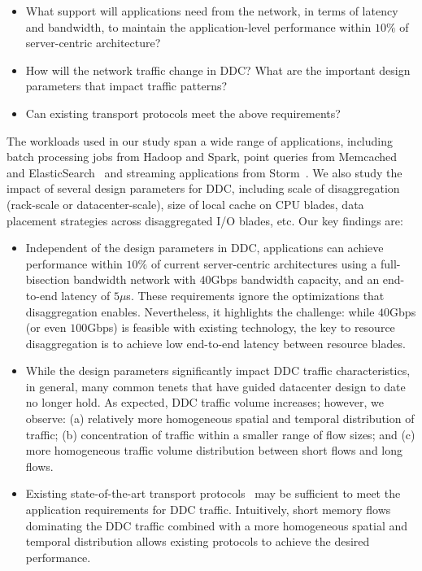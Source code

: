 \begin{itemize}[leftmargin=*]
	\itemsep0em
		\item What support will applications need from the network, in terms of latency and bandwidth, to maintain the application-level performance within $10\%$ of server-centric architecture?
	\item How will the network traffic change in DDC? What are the important design parameters that impact traffic patterns?
    \item Can existing transport protocols meet the above requirements? 
\end{itemize}

\noindent
The workloads used in our study span a wide range of applications, including batch processing jobs from Hadoop and Spark, point queries from Memcached~\cite{memcached} and ElasticSearch~\cite{elastic} and streaming applications from Storm~\cite{storm}. We also study the impact of several design parameters for DDC, including scale of disaggregation (rack-scale or datacenter-scale), size of local cache on CPU blades, data placement strategies across disaggregated I/O blades, etc. Our key findings are:

\begin{itemize}[leftmargin=*]
	\itemsep0em
		\item Independent of the design parameters in DDC, applications can achieve performance within $10\%$ of current server-centric architectures using a full-bisection bandwidth network with $40$Gbps bandwidth capacity, and an end-to-end latency of $5\mu$s. These requirements ignore the optimizations that disaggregation enables. Nevertheless, it highlights the challenge: while $40$Gbps (or even $100$Gbps) is feasible with existing technology, the key to resource disaggregation is to achieve low end-to-end latency between resource blades. 
	    \item While the design parameters significantly impact DDC traffic characteristics, in general, many common tenets that have guided datacenter design to date no longer hold. As expected, DDC traffic volume increases; however, we observe: (a) relatively more homogeneous spatial and temporal distribution of traffic; (b) concentration of traffic within a smaller range of flow sizes; and (c) more homogeneous traffic volume distribution between short flows and long flows. 
        \item Existing state-of-the-art transport protocols~\cite{pfabric} may be sufficient to meet the application requirements for DDC traffic. Intuitively, short memory flows dominating the DDC traffic combined with a more homogeneous spatial and temporal distribution allows existing protocols to achieve the desired performance. 
\end{itemize}

